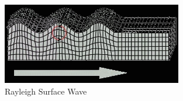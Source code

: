 \begin{figure}[ht]
	\centering
	\includegraphics[width=0.7\textwidth]{Images/Rayleigh_surface_waves.jpg}
	\caption{Rayleigh Surface Wave}
	\label{fig:SurfaceWaves}
\end{figure}
























